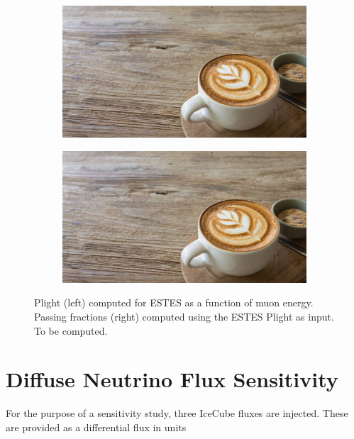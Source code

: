 \documentclass{PoS}
\begin{document}
\begin{figure}[h!]
  \centering
  \begin{subfigure}[b]{0.45\linewidth}
    \includegraphics[width=\linewidth]{coffee-cup-on-decking.jpg}
  \end{subfigure}
  \begin{subfigure}[b]{0.45\linewidth}
    \includegraphics[width=\linewidth]{coffee-cup-on-decking.jpg}
  \end{subfigure}
  \caption{Plight (left) computed for ESTES as a function of muon energy. Passing fractions (right) computed using the ESTES Plight as input. To be computed.}
  \label{fig:passfracs}
\end{figure}
\fi


\section{Diffuse Neutrino Flux Sensitivity}\label{sec:Diffuse}
For the purpose of a sensitivity study, three IceCube fluxes are injected. These are provided as a differential flux in units 
\end{document}
